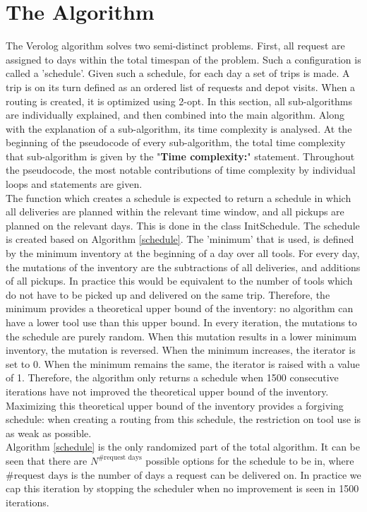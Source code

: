 \documentclass[a4paper]{article}
\begin{document}
\section{The Algorithm}
The Verolog algorithm solves two semi-distinct problems. First, all request are assigned to days within the total timespan of the problem. Such a configuration is called a 'schedule'. Given such a schedule, for each day a set of trips is made. A trip is on its turn defined as an ordered list of requests and depot visits. When a routing is created, it is optimized using 2-opt. In this section, all sub-algorithms are individually explained, and then combined into the main algorithm. Along with the explanation of a sub-algorithm, its time complexity is analysed. At the beginning of the pseudocode of every sub-algorithm, the total time complexity that sub-algorithm is given by the "\textbf{Time complexity:}" statement. Throughout the pseudocode, the most notable contributions of time complexity by individual loops and statements are given. \\

The function which creates a schedule is expected to return a schedule in which all deliveries are planned within the relevant time window, and all pickups are planned on the relevant days. This is done in the class InitSchedule. The schedule is created based on Algorithm \ref{schedule}. The 'minimum' that is used, is defined by the minimum inventory at the beginning of a day over all tools. For every day, the mutations of the inventory are the subtractions of all deliveries, and additions of all pickups. In practice this would be equivalent to the number of tools which do not have to be picked up and delivered on the same trip. Therefore, the minimum provides a theoretical upper bound of the inventory: no algorithm can have a lower tool use than this upper bound. In every iteration, the mutations to the schedule are purely random. When this mutation results in a lower minimum inventory, the mutation is reversed. When the minimum increases, the iterator is set to 0. When the minimum remains the same, the iterator is raised with a value of 1. Therefore, the algorithm only returns a schedule when 1500 consecutive iterations have not improved the theoretical upper bound of the inventory. Maximizing this theoretical upper bound of the inventory provides a forgiving schedule: when creating a routing from this schedule, the restriction on tool use is as weak as possible. \\ Algorithm \ref{schedule} is the only randomized part of the total algorithm. It can be seen that there are $N^{\text{\#request days}}$ possible options for the schedule to be in, where $\#\text{request days}$ is the number of days a request can be delivered on. In practice we cap this iteration by stopping the scheduler when no improvement is seen in 1500 iterations. \\
\end{document}
